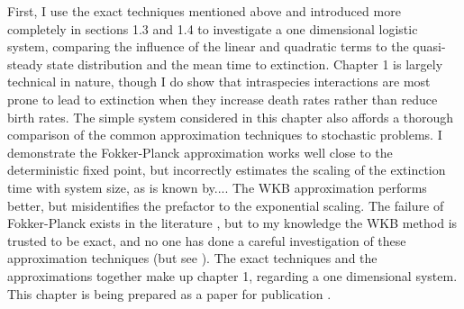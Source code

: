 First, I use the exact techniques mentioned above and introduced more completely in sections 1.3 and 1.4 to investigate a one dimensional logistic system, comparing the influence of the linear and quadratic terms to the quasi-steady state distribution and the mean time to extinction. %
Chapter 1 is largely technical in nature, though I do show that intraspecies interactions are most prone to lead to extinction when they increase death rates rather than reduce birth rates. 
The simple system considered in this chapter also affords a thorough comparison of the common approximation techniques to stochastic problems. %
I demonstrate the Fokker-Planck approximation works well close to the deterministic fixed point, but incorrectly estimates the scaling of the extinction time with system size, as is known by.... 
The WKB approximation performs better, but misidentifies the prefactor to the exponential scaling. %
The failure of Fokker-Planck exists in the literature \cite{Grasman1983,Doering2005,Ovaskainen2010,Yu2017}, but to my knowledge the WKB method is trusted to be exact, and no one has done a careful investigation of these approximation techniques (but see \cite{Allen2003a,Yu2017}). 
The exact techniques and the approximations together make up chapter 1, regarding a one dimensional system. %
This chapter is being prepared as a paper for publication \cite{Badali2018a}. 

